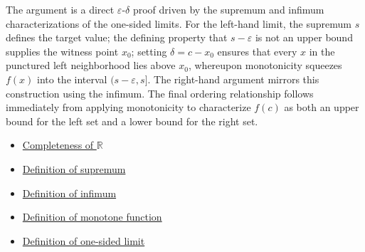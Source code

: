 \begin{remark*}
The argument is a direct $\varepsilon$-$\delta$ proof driven by the supremum and infimum characterizations of the one-sided limits. For the left-hand limit, the supremum $s$ defines the target value; the defining property that $s - \varepsilon$ is not an upper bound supplies the witness point $x_0$; setting $\delta = c - x_0$ ensures that every $x$ in the punctured left neighborhood lies above $x_0$, whereupon monotonicity squeezes $f(x)$ into the interval $(s - \varepsilon, s]$. The right-hand argument mirrors this construction using the infimum. The final ordering relationship follows immediately from applying monotonicity to characterize $f(c)$ as both an upper bound for the left set and a lower bound for the right set.
\end{remark*}

\begin{dependencies}
\begin{itemize}
  \item \hyperref[ax:completeness-of-reals]{Completeness of $\mathbb{R}$}
  \item \hyperref[def:supremum]{Definition of supremum}
  \item \hyperref[def:infimum]{Definition of infimum}
  \item \hyperref[def:function-monotone]{Definition of monotone function}
  \item \hyperref[def:one-sided-limit]{Definition of one-sided limit}
\end{itemize}
\end{dependencies}

\clearpage
